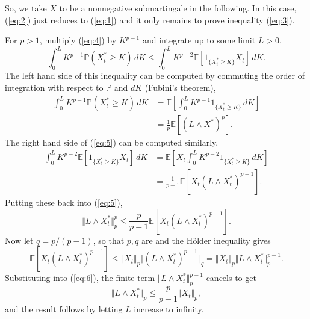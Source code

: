 \documentclass[12pt]{article}
\begin{document}
So, we take $X$ to be a nonnegative submartingale in the following. In this case, (\ref{eq:2}) just reduces to (\ref{eq:1}) and it only remains to prove inequality (\ref{eq:3}).

For $p>1$, multiply (\ref{eq:4}) by $K^{p-1}$ and integrate up to some limit $L>0$,
\begin{equation}\label{eq:5}
\int_0^LK^{p-1}\mathbb{P}(X^*_t\ge K)\,dK\le \int_0^LK^{p-2}\mathbb{E}[1_{\{X^*_t\ge K\}}X_t]\,dK.
\end{equation}
The left hand side of this inequality can be computed by commuting the order of integration with respect to $\mathbb{P}$ and $dK$ (Fubini's theorem),
\begin{equation*}\begin{split}
\int_0^L K^{p-1}\mathbb{P}(X^*_t\ge K)\,dK
&=\mathbb{E}\left[\int_0^L K^{p-1}1_{\{X^*_t\ge K\}}\,dK\right]\\
&=\frac{1}{p}\mathbb{E}[(L\wedge X^*)^p].
\end{split}\end{equation*}
The right hand side of (\ref{eq:5}) can be computed similarly,
\begin{equation*}\begin{split}
\int_0^LK^{p-2}\mathbb{E}[1_{\{X^*_t\ge K\}}X_t]\,dK
&=\mathbb{E}\left[X_t\int_0^LK^{p-2}1_{\{X^*_t\ge K\}}\,dK\right]\\
&=\frac{1}{p-1}\mathbb{E}[X_t(L\wedge X^*_t)^{p-1}].
\end{split}\end{equation*}
Putting these back into (\ref{eq:5}),
\begin{equation}\label{eq:6}
\Vert L\wedge X^*_t\Vert_p^p\le\frac{p}{p-1}\mathbb{E}[X_t(L\wedge X^*_t)^{p-1}].
\end{equation}
Now let $q=p/(p-1)$, so that $p,q$ are  and the H\"older inequality gives
\begin{equation*}
\mathbb{E}[X_t(L\wedge X^*_t)^{p-1}]
\le\Vert X_t\Vert_p \Vert (L\wedge X^*_t)^{p-1}\Vert_q
=\Vert X_t\Vert_p \Vert L\wedge X^*_t\Vert_p^{p-1}.
\end{equation*}
Substituting into (\ref{eq:6}), the finite term $\Vert L\wedge X^*_t\Vert_p^{p-1}$ cancels to get
\begin{equation*}
\Vert L\wedge X^*_t \Vert_p\le \frac{p}{p-1}\Vert X_t\Vert_p,
\end{equation*}
and the result follows by letting $L$ increase to infinity.

\end{document}
